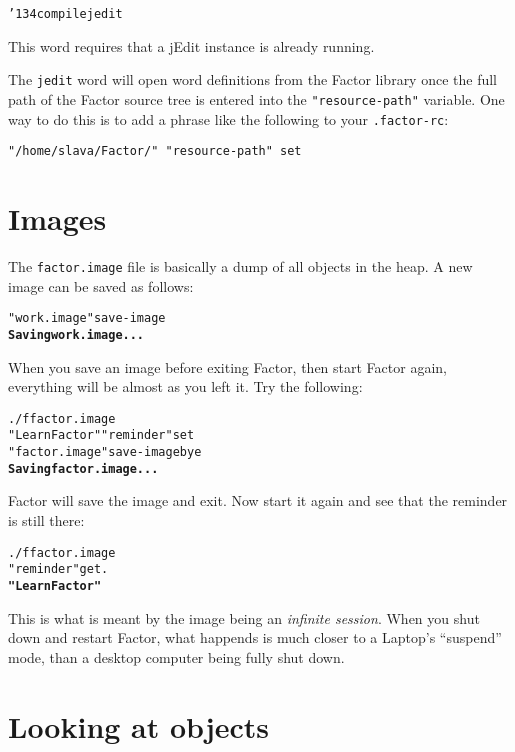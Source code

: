 \documentclass{book}
\newcommand{\bs}{\char'134}
\begin{document}
\begin{alltt}
  \bs compile jedit
\end{alltt}

This word requires that a jEdit instance is already running.

The \texttt{jedit} word will open word definitions from the Factor library once the full path of the Factor source tree is entered into the \texttt{"resource-path"} variable. One way to do this is to add a phrase like the following to your \texttt{.factor-rc}:

\begin{verbatim}
"/home/slava/Factor/" "resource-path" set
\end{verbatim}

\section{Images}

The \texttt{factor.image} file is basically a dump of all objects in the heap. A new image can be saved as follows:

\begin{alltt}
  "work.image" save-image
\textbf{Saving work.image...}
\end{alltt}

When you save an image before exiting Factor, then start Factor again, everything will be almost as you left it. Try the following:

\begin{alltt}
./f factor.image
  "Learn Factor" "reminder" set
  "factor.image" save-image bye
\textbf{Saving factor.image...}
\end{alltt}

Factor will save the image and exit. Now start it again and see that the reminder is still there:

\begin{alltt}
./f factor.image
  "reminder" get .
\textbf{"Learn Factor"}
\end{alltt}

This is what is meant by the image being an \emph{infinite session}. When you shut down and restart Factor, what happends is much closer to a Laptop's ``suspend'' mode, than a desktop computer being fully shut down.

\section{Looking at objects}
\end{document}
